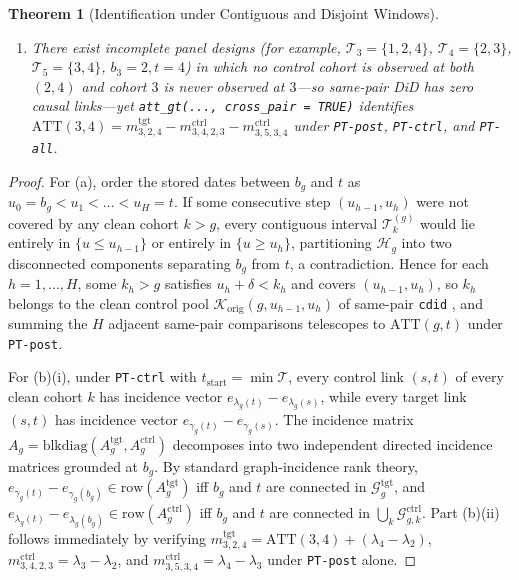 \documentclass[11pt]{article}
\newtheorem{theorem}{Theorem}
\theoremstyle{definition}
\theoremstyle{remark}
\begin{document}
\begin{theorem}[Identification under Contiguous and Disjoint Windows]
\begin{enumerate}
\begin{enumerate}
\item[(ii)] There exist incomplete panel designs (for example, $\mathcal{T}_3 = \{1,2,4\}$, $\mathcal{T}_4 = \{2,3\}$, $\mathcal{T}_5 = \{3,4\}$, $b_3 = 2, t = 4$) in which no control cohort is observed at both $(2,4)$ and cohort $3$ is never observed at $3$---so same-pair DiD has zero causal links---yet \texttt{att\_gt(..., cross\_pair = TRUE)} identifies $\mathrm{ATT}(3,4) = m^{\mathrm{tgt}}_{3,2,4} - m^{\mathrm{ctrl}}_{3,4,2,3} - m^{\mathrm{ctrl}}_{3,5,3,4}$ under \texttt{PT-post}, \texttt{PT-ctrl}, and \texttt{PT-all}.
\end{enumerate}
\end{enumerate}
\end{theorem}

\begin{proof}
For (a), order the stored dates between $b_g$ and $t$ as $u_0 = b_g < u_1 < \dots < u_H = t$. If some consecutive step $(u_{h-1}, u_h)$ were not covered by any clean cohort $k > g$, every contiguous interval $\mathcal{T}_k^{(g)}$ would lie entirely in $\{u \le u_{h-1}\}$ or entirely in $\{u \ge u_h\}$, partitioning $\mathcal{H}_g$ into two disconnected components separating $b_g$ from $t$, a contradiction. Hence for each $h = 1,\dots,H$, some $k_h > g$ satisfies $u_h + \delta < k_h$ and covers $(u_{h-1}, u_h)$, so $k_h$ belongs to the clean control pool $\mathcal{K}_{\mathrm{orig}}(g, u_{h-1}, u_h)$ of same-pair \texttt{cdid} \cite{BBD2025}, and summing the $H$ adjacent same-pair comparisons telescopes to $\mathrm{ATT}(g,t)$ under \texttt{PT-post}.

For (b)(i), under \texttt{PT-ctrl} with $t_{\mathrm{start}} = \min\mathcal{T}$, every control link $(s,t)$ of every clean cohort $k$ has incidence vector $e_{\lambda_g(t)} - e_{\lambda_g(s)}$, while every target link $(s,t)$ has incidence vector $e_{\gamma_g(t)} - e_{\gamma_g(s)}$. The incidence matrix $A_g = \mathrm{blkdiag}(A_g^{\mathrm{tgt}}, A_g^{\mathrm{ctrl}})$ decomposes into two independent directed incidence matrices grounded at $b_g$. By standard graph-incidence rank theory, $e_{\gamma_g(t)} - e_{\gamma_g(b_g)} \in \mathrm{row}(A_g^{\mathrm{tgt}})$ iff $b_g$ and $t$ are connected in $\mathcal{G}_g^{\mathrm{tgt}}$, and $e_{\lambda_g(t)} - e_{\lambda_g(b_g)} \in \mathrm{row}(A_g^{\mathrm{ctrl}})$ iff $b_g$ and $t$ are connected in $\bigcup_{k} \mathcal{G}^{\mathrm{ctrl}}_{g,k}$. Part (b)(ii) follows immediately by verifying $m^{\mathrm{tgt}}_{3,2,4} = \mathrm{ATT}(3,4) + (\lambda_4 - \lambda_2)$, $m^{\mathrm{ctrl}}_{3,4,2,3} = \lambda_3 - \lambda_2$, and $m^{\mathrm{ctrl}}_{3,5,3,4} = \lambda_4 - \lambda_3$ under \texttt{PT-post} alone.
\end{proof}
\end{document}
